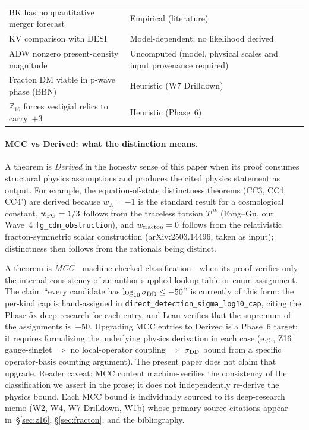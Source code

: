 \documentclass[aps,prd,twocolumn,showpacs,superscriptaddress,nofootinbib]{revtex4-2}
\begin{document}
\begin{table}[ht]
\begin{tabular}{@{}ll@{}}
BK has no quantitative merger forecast & Empirical (literature) \\
KV comparison with DESI & Model-dependent; no likelihood derived \\
ADW nonzero present-density magnitude & Uncomputed (model, physical scales and input provenance required) \\
Fracton DM viable in p-wave phase (BBN) & Heuristic (W7 Drilldown) \\
$\mathbb{Z}_{16}$ forces vestigial relics to carry~$+3$ & Heuristic (Phase~6) \\
\bottomrule
\end{tabular}
\end{table}

\paragraph*{MCC vs Derived: what the distinction means.}
A theorem is \emph{Derived} in the honesty sense of this paper when its
proof consumes structural physics assumptions and produces the cited
physics statement as output. For example, the equation-of-state
distinctness theorems (CC3, CC4, CC4') are derived because
$w_\Lambda = -1$ is the standard result for a cosmological constant,
$w_{\rm FG} = 1/3$ follows from the traceless torsion $T^{\mu\nu}$
(Fang--Gu, our Wave~4 \texttt{fg\_cdm\_obstruction}), and
$w_{\rm fracton} = 0$ follows from the relativistic fracton-symmetric
scalar construction (arXiv:2503.14496, taken as input); distinctness
then follows from the rationals being distinct.

A theorem is \emph{MCC}---machine-checked classification---when its
proof verifies only the internal consistency of an author-supplied
lookup table or enum assignment. The claim ``every candidate has
$\log_{10}\sigma_{\rm DD} \leq -50$'' is currently of this form: the
per-kind cap is hand-assigned in \texttt{direct\_detection\_sigma\_log10\_cap},
citing the Phase 5x deep research for each entry, and Lean verifies
that the supremum of the assignments is~$-50$. Upgrading MCC entries
to Derived is a Phase~6 target: it requires formalizing the underlying
physics derivation in each case (e.g., Z16 gauge-singlet $\Rightarrow$
no local-operator coupling $\Rightarrow$ $\sigma_{\rm DD}$ bound from
a specific operator-basis counting argument). The present paper does
not claim that upgrade. Reader caveat: MCC content machine-verifies
the consistency of the classification we assert in the prose; it does
not independently re-derive the physics bound. Each MCC bound is
individually sourced to its deep-research memo (W2, W4, W7
Drilldown, W1b) whose primary-source citations appear in~\S\ref{sec:z16},
\S\ref{sec:fracton}, and the bibliography.
\end{document}
